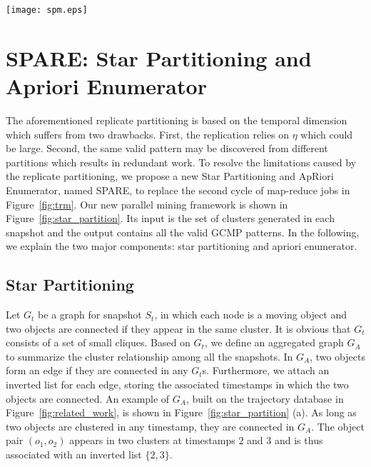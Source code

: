 \begin{figure*}[t]
\centering
\texttt{[image: spm.eps]}
\caption{Star partition and mining. (a) Conceptual connection graph from Figure 1.(b) Five star partitions are generated
(c) Apriori Mining with various pruning techniques.}
\label{fig:star_partition}
\end{figure*}

\section{SPARE: Star Partitioning and Apriori Enumerator}
\label{sec:spm}
The aforementioned replicate partitioning is based on the temporal dimension which suffers from two drawbacks. First, the replication relies on $\eta$ which could be large. Second, the same valid pattern may be discovered from different partitions which results in redundant work.
To resolve the limitations caused by the replicate partitioning, 
we propose a new Star Partitioning and ApRiori Enumerator, named SPARE, 
to replace the second cycle of map-reduce jobs in Figure~\ref{fig:trm}. 
Our new parallel mining framework is shown in Figure~\ref{fig:star_partition}. 
Its input is the set of clusters generated in each snapshot and the output 
contains all the valid GCMP patterns. In the following, we explain the two major components: 
star partitioning and apriori enumerator.


\subsection{Star Partitioning}
Let $G_t$ be a graph for snapshot $S_t$, in which each node 
is a moving object and two objects are connected if they appear 
in the same cluster. It is obvious that $G_t$ consists of a set of small cliques. 
Based on $G_t$, we define an aggregated graph $G_A$ to summarize the 
cluster relationship among all the snapshots. In $G_A$, two objects
form an edge if they are connected in any $G_t$s. Furthermore, 
we attach an inverted list for each edge, 
storing the associated timestamps in which the two objects are connected. 
An example of $G_A$, built on the trajectory database in Figure~\ref{fig:related_work}, 
is shown in Figure~\ref{fig:star_partition} (a). 
As long as two objects are clustered in any timestamp, they are connected in $G_A$. 
The object pair $(o_1,o_2)$ appears in two clusters at timestamps 
$2$ and $3$ and is thus associated with an inverted list $\{2,3\}$.


